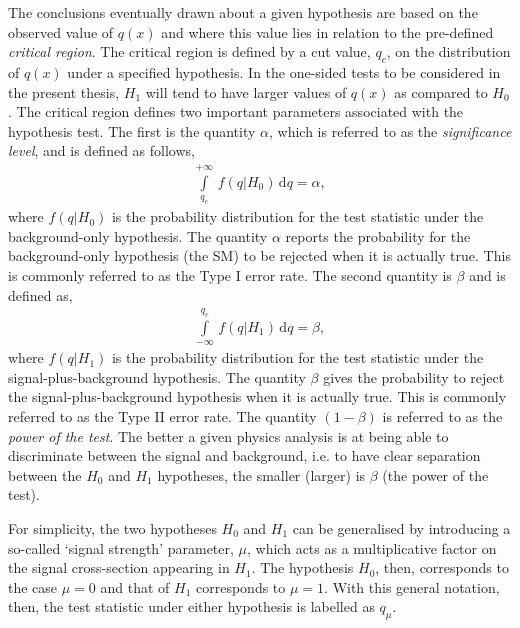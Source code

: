 The conclusions eventually drawn about a given hypothesis are based on the observed value
of $q(x)$ and where this value lies in relation to the pre-defined \textit{critical region}.
The critical region is defined by a cut value, $q_c$, on the distribution of $q(x)$ under a specified hypothesis.
In the one-sided tests to be considered in the present thesis, $H_1$
will tend to have larger values of $q(x)$ as compared to $H_0$.
The critical region defines two important parameters associated with the hypothesis test.
The first is the quantity $\alpha$, which is referred to as the \textit{significance level},
and is defined as follows,
\begin{align}
    \int\limits_{q_c}^{+\infty} \, f(q | H_0) \, \mathrm{d}q = \alpha,
    \label{eq:sig_level}
\end{align}
where $f(q|H_0)$ is the probability distribution for the test statistic under
the background-only hypothesis.
The quantity $\alpha$ reports the probability for the background-only hypothesis (the SM) to be rejected when it is actually
true. This is commonly referred to as the Type I error rate.
The second quantity is $\beta$ and is defined as,
\begin{align}
    \int\limits_{-\infty}^{q_c} \, f(q|H_1) \, \mathrm{d}q = \beta,
    \label{eq:power_level}
\end{align}
where $f(q|H_1)$ is the probability distribution for the test statistic under
the signal-plus-background hypothesis.
The quantity $\beta$ gives the probability to reject the signal-plus-background hypothesis
when it is actually true. This is commonly referred to as the Type II error rate.
The quantity $(1-\beta)$ is referred to as the \textit{power of the test}.
The better a given physics analysis is at being able to discriminate between the signal
and background, i.e. to have clear separation between the $H_0$ and $H_1$ hypotheses,
the smaller (larger) is $\beta$ (the power of the test).

For simplicity, the two hypotheses $H_0$ and $H_1$ can be generalised by introducing a so-called
`signal strength' parameter, $\mu$, which acts as a multiplicative factor on the signal cross-section
appearing in $H_1$.
The hypothesis $H_0$, then, corresponds to the case $\mu = 0$ and that of $H_1$ corresponds to
$\mu = 1$.
With this general notation, then, the test statistic under either hypothesis is labelled as $q_{\mu}$.

